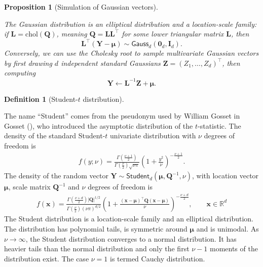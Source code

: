 \documentclass[
  11pt,
  letterpaper,
]{scrbook}
\theoremstyle{definition}
\theoremstyle{plain}
\newtheorem{proposition}{Proposition}[chapter]
\theoremstyle{plain}
\theoremstyle{definition}
\theoremstyle{definition}
\newtheorem{definition}{Definition}[chapter]
\theoremstyle{remark}
\begin{document}
\begin{proposition}[Simulation of Gaussian
vectors]\protect\hypertarget{prp-gaussian-dist-property}{}\label{prp-gaussian-dist-property}

The Gaussian distribution is an elliptical distribution and a
location-scale family: if
\(\boldsymbol{L} = \mathrm{chol}(\boldsymbol{Q})\), meaning
\(\boldsymbol{Q}=\boldsymbol{LL}^\top\) for some lower triangular matrix
\(\boldsymbol{L}\), then
\[\boldsymbol{L}^\top(\boldsymbol{Y}-\boldsymbol{\mu}) \sim \mathsf{Gauss}_d(\boldsymbol{0}_d, \mathbf{I}_d).\]
Conversely, we can use the Cholesky root to sample multivariate Gaussian
vectors by first drawing \(d\) independent standard Gaussians
\(\boldsymbol{Z}=(Z_1, \ldots, Z_d)^\top\), then computing
\[\boldsymbol{Y} \gets \boldsymbol{L}^{-1}\boldsymbol{Z}+ \boldsymbol{\mu}.\]

\end{proposition}

\begin{definition}[Student-\(t\)
distribution]\protect\hypertarget{def-student-dist}{}\label{def-student-dist}

The name ``Student'' comes from the pseudonym used by William Gosset in
Gosset (), who introduced the
asymptotic distribution of the \(t\)-statistic. The density of the
standard Student-\(t\) univariate distribution with \(\nu\) degrees of
freedom is \begin{align*}
f(y; \nu) = \frac{\Gamma \left( \frac{\nu+1}{2}\right)}{\Gamma\left(\frac{\nu}{2}\right)
\sqrt{\nu\pi}}\left(1+\frac{y^{2}}{\nu}\right)^{-\frac{\nu+1}{2}}.
\end{align*} The density of the random vector
\(\boldsymbol{Y} \sim \mathsf{Student}_d(\boldsymbol{\mu}, \boldsymbol{Q}^{-1}, \nu)\),
with location vector \(\boldsymbol{\mu}\), scale matrix
\(\boldsymbol{Q}^{-1}\) and \(\nu\) degrees of freedom is \begin{align*}
f(\boldsymbol{x}) = \frac{\Gamma \left( \frac{\nu+d}{2}\right)|\boldsymbol{Q}|^{1/2}}{\Gamma\left(\frac{\nu}{2}\right)
(\nu\pi)^{d/2}}\left(1+\frac{(\boldsymbol{x}-\boldsymbol{\mu})^\top\boldsymbol{Q}(\boldsymbol{x}-\boldsymbol{\mu})}{\nu} \right)^{-\frac{\nu+d}{2}}, \qquad \boldsymbol{x} \in \mathbb{R}^d
\end{align*} The Student distribution is a location-scale family and an
elliptical distribution. The distribution has polynomial tails, is
symmetric around \(\boldsymbol{\mu}\) and is unimodal. As
\(\nu \to \infty\), the Student distribution converges to a normal
distribution. It has heavier tails than the normal distribution and only
the first \(\nu-1\) moments of the distribution exist. The case
\(\nu=1\) is termed Cauchy distribution.

\end{definition}
\end{document}

